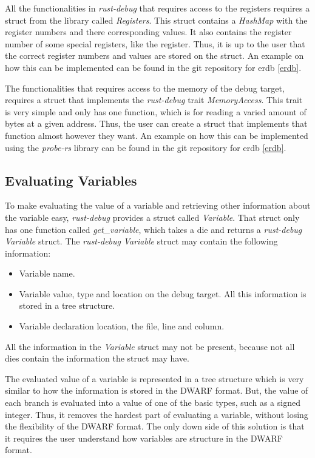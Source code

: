 All the functionalities in \emph{rust-debug} that requires access to the registers requires a struct from the library called \emph{Registers}.
This struct contains a \emph{HashMap} with the register numbers and there corresponding values.
It also contains the register number of some special registers, like the  register.
Thus, it is up to the user that the correct register numbers and values are stored on the struct.  
An example on how this can be implemented can be found in the git repository for \gls{erdb} \ref{erdb}.


The functionalities that requires access to the memory of the debug target, requires a struct that implements the \emph{rust-debug} trait \emph{MemoryAccess}.
This trait is very simple and only has one function, which is for reading a varied amount of bytes at a given address.
Thus, the user can create a struct that implements that function almost however they want.
An example on how this can be implemented using the \emph{probe-rs} library can be found in the git repository for \gls{erdb} \ref{erdb}.



\subsection{Evaluating Variables} \label{sec:ievalvar}
To make evaluating the value of a variable and retrieving other information about the variable easy, \emph{rust-debug} provides a struct called \emph{Variable}.
That struct only has one function called \emph{get\_variable}, which takes a \gls{die} and returns a \emph{rust-debug} \emph{Variable} struct.
The \emph{rust-debug} \emph{Variable} struct may contain the following information:


\begin{itemize}
  \item Variable name.
  \item Variable value, type and location on the debug target. All this information is stored in a tree structure.
  \item Variable declaration location, the file, line and column.
\end{itemize}


All the information in the \emph{Variable} struct may not be present, because not all \glspl{die} contain the information the struct may have.


The evaluated value of a variable is represented in a tree structure which is very similar to how the information is stored in the \gls{DWARF} format.
But, the value of each branch is evaluated into a value of one of the basic types, such as a signed integer.
Thus, it removes the hardest part of evaluating a variable, without losing the flexibility of the \gls{DWARF} format.
The only down side of this solution is that it requires the user understand how variables are structure in the \gls{DWARF} format.


